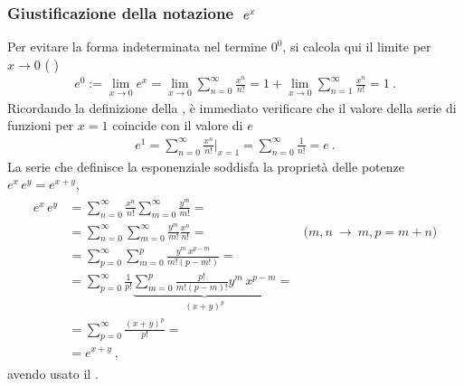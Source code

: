 \documentclass[letterpaper,10pt,italian]{jupyterBook}
\begin{document}
\subsubsection{Giustificazione della notazione \protect\(\ e^x\protect\)}
\label{\detokenize{ch/precalculus/exponential_logarithm-notes:giustificazione-della-notazione-e-x}}\label{\detokenize{ch/precalculus/exponential_logarithm-notes:math-hs-exp-log-notes-powers}}
\sphinxAtStartPar
Per evitare la forma indeterminata nel termine \(0^0\), si calcola qui il limite per \(x \rightarrow 0\) ( )
\begin{equation*}
\begin{split}e^0 := \lim_{x \rightarrow 0} e^x = \lim_{x \rightarrow 0} \sum_{n = 0}^{\infty} \frac{x^n}{n!} = 1 + \lim_{x \rightarrow 0} \sum_{n=1}^{\infty} \frac{x^n}{n!} = 1 \ .\end{split}
\end{equation*}
\sphinxAtStartPar
Ricordando la definizione della {\hyperref[\detokenize{ch/series/series-numerical-real:math-hs-series-e-euler}]{}}, è immediato verificare che il valore della serie di funzioni per \(x = 1\) coincide con il valore di \(e\)
\begin{equation*}
\begin{split}e^1 = \sum_{n=0}^{\infty} \frac{x^n}{n!} \bigg|_{x=1} = \sum_{n=0}^{\infty} \frac{1}{n!} = e \ .\end{split}
\end{equation*}
\sphinxAtStartPar
La serie che definisce la esponenziale soddisfa la proprietà delle potenze \(e^x \, e^y = e^{x+y}\),
\begin{equation*}
\begin{split}\begin{aligned}
  e^x \, e^y 
  & = \sum_{n=0}^{\infty} \frac{x^n}{n!} \sum_{m = 0}^{\infty} \frac{y^m}{m!} = \\
  & = \sum_{n=0}^{\infty} \sum_{m=0}^{\infty} \frac{y^m}{m!} \frac{x^n}{n!} =  & \text{($m,n \  \rightarrow \ m,p=m+n$)}\\
  & = \sum_{p=0}^{\infty} \sum_{m=0}^{p} \frac{y^m \, x^{p-m}}{m! (p-m!)} = \\
  & = \sum_{p=0}^{\infty} \frac{1}{p!} \underbrace{\sum_{m=0}^{p} \frac{p!}{m! (p-m)!} y^m \, x^{p-m}}_{(x+y)^p} = \\
  & = \sum_{p=0}^{\infty} \frac{(x+y)^p}{p!} = \\
  & = e^{x+y} \ ,
\end{aligned}\end{split}
\end{equation*}
\sphinxAtStartPar
avendo usato il {\hyperref[\detokenize{ch/precalculus/polynomials:math-hs-precalculus-polynomials-binomial-thm}]{}}.
\end{document}
